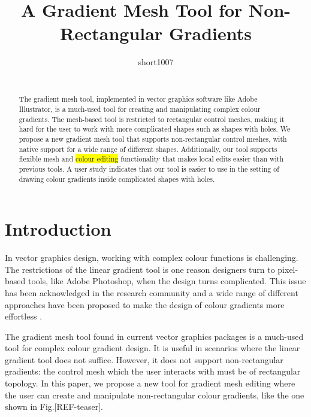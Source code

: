 \documentclass{egpubl}
\title[Non-rectangular gradient mesh tool]
{A Gradient Mesh Tool for Non-Rectangular Gradients}
\author[short1007]
{\parbox{\textwidth}{\centering short1007}
	\\
	{\parbox{\textwidth}{\centering } }
}
\begin{document}
	
	
	\maketitle
	
	\begin{abstract}
		The gradient mesh tool, implemented in vector graphics software like Adobe Illustrator, is a much-used tool for creating and manipulating complex colour gradients. The mesh-based tool is restricted to rectangular control meshes, making it hard for the user to work with more complicated shapes such as shapes with holes. We propose a new gradient mesh tool that supports non-rectangular control meshes, with native support for a wide range of different shapes. Additionally, our tool supports flexible mesh and \colorbox{yellow}{colour editing} functionality that makes local edits easier than with previous tools. A user study indicates that our tool is easier to use in the setting of drawing colour gradients inside complicated shapes with holes.
		
		\begin{classification} %
		\end{classification}
		
	\end{abstract}
	
	\section{Introduction}
	\label{sec:intro}
	
	In vector graphics design, working with complex colour functions is challenging. The restrictions of the linear gradient tool is one reason designers turn to pixel-based tools, like Adobe Photoshop, when the design turns complicated. This issue has been acknowledged in the research community and a wide range of different approaches have been proposed to make the design of colour gradients more effortless \cite{Orzan:2008,Lopez-Moreno:2013}.
	
	The gradient mesh tool found in current vector graphics packages is a much-used tool for complex colour gradient design.	It is useful in scenarios where the linear gradient tool does not suffice. However, it does not support non-rectangular gradients: the control mesh which the user interacts with must be of rectangular topology. In this paper, we propose a new tool for gradient mesh editing where the user can create and manipulate non-rectangular colour gradients, like the one shown in Fig.[REF-teaser].
	
\end{document}

